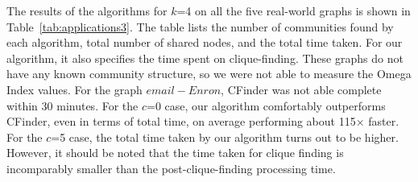 The results of the algorithms for $k$=4 on all the five real-world graphs is shown in 
Table~\ref{tab:applications3}. The table lists the number of communities found by each algorithm, total number of shared nodes, and the total time taken. For our algorithm, it also specifies the time spent on clique-finding. These graphs do not have any known community structure, so we were not able to measure the Omega Index values. For the graph $email-Enron$, CFinder was not able complete within 30 minutes. For the $c$=0 case, our algorithm comfortably outperforms CFinder, even in terms of total time, on average performing about 115$\times$ faster. For the $c$=5 case, the total time taken by our algorithm turns out to be higher. However, it should be noted that the time taken for clique finding is incomparably smaller than the post-clique-finding processing time.  











